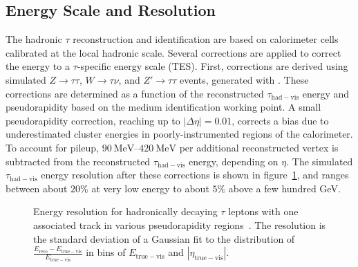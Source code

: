 \subsection{Energy Scale and Resolution}\label{sec:reco-tau-energymomentum}
The hadronic $\tau$ reconstruction and identification are based on calorimeter cells calibrated at the local hadronic scale. Several corrections are applied to correct the energy to a $\tau$-specific energy scale (TES). First, corrections are derived using simulated $Z\rightarrow\tau\tau$, $W\rightarrow\tau\nu$, and $Z'\rightarrow\tau\tau$ events, generated with . These corrections are determined as a function of the reconstructed $\tau_{\mathrm{had-vis}}$ energy and pseudorapidity based on the medium identification working point. A small pseudorapidity correction, reaching up to $|\Delta\eta|=0.01$, corrects a bias due to underestimated cluster energies in poorly-instrumented regions of the calorimeter. To account for pileup, $\SIrange[range-phrase=-]{90}{420}{\mega\electronvolt}$ per additional reconstructed vertex is subtracted from the reconstructed $\tau_{\mathrm{had-vis}}$ energy, depending on $\eta$. The simulated $\tau_{\mathrm{had-vis}}$ energy resolution after these corrections is shown in figure~\ref{fig:reco-tau-energy-resolution}, and ranges between about $20\%$ at very low energy to about $5\%$ above a few hundred GeV.

\begin{figure}[htbp]
	\centering
	\caption{Energy resolution for hadronically decaying $\tau$ leptons with one associated track in various pseudorapidity regions~\cite{TheATLASCollaboration:2015be}. The resolution is the standard deviation of a Gaussian fit to the distribution of $\frac{E_{\mathrm{reco}}-E_{\mathrm{true-vis}}}{E_{\mathrm{true-vis}}}$ in bins of $E_{\mathrm{true-vis}}$ and $|\eta_{\mathrm{true-vis}}|$.}
	\label{fig:reco-tau-energy-resolution}
\end{figure}


